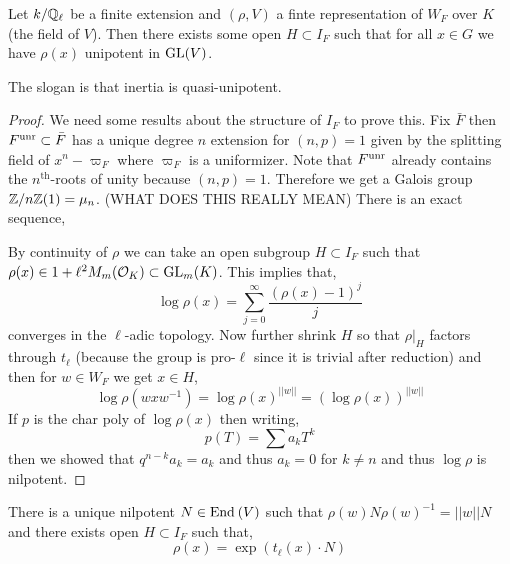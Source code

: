 \documentclass[12pt]{article}
\begin{document}
\begin{thm}
Let $k / \mathbb{Q}_\ell$ be a finite extension and $(\rho, V)$ a finte representation of $W_F$ over $K$ (the field of $V$). Then there exists some open $H \subset I_F$ such that for all $x \in G$ we have $\rho(x)$ unipotent in $\mathrm{GL}(V)$.
\end{thm}

\begin{rmk}
The slogan is that inertia is quasi-unipotent. 
\end{rmk}

\begin{proof}
We need some results about the structure of $I_F$ to prove this.
 Fix $\bar{F}$ then $F^{\mathrm{unr}} \subset \bar{F}$ has a unique degree $n$ extension for $(n,p) = 1$ given by the splitting field of $x^n - \varpi_F$ where $\varpi_F$ is a uniformizer. Note that $F^{\mathrm{unr}}$ already contains the $n^{\text{th}}$-roots of unity because $(n,p) = 1$. Therefore we get a Galois group $\mathbb{Z} / n \mathbb{Z}(1) = \mu_n$. (WHAT DOES THIS REALLY MEAN) There is an exact sequence,
\begin{center}
\end{center}
By continuity of $\rho$ we can take an open subgroup $H \subset I_F$ such that $\rho(x) \in 1 + \ell^2 M_m(\mathcal{O}_{K}) \subset \mathrm{GL}_m(K)$. This implies that,
\[ \log{\rho(x)} = \sum_{j = 0}^\infty \frac{(\rho(x) - 1)^j}{j} \]
converges in the $\ell$-adic topology. Now further shrink $H$ so that $\rho|_H$ factors through $t_{\ell}$ (because the group is pro-$\ell$ since it is trivial after reduction) and then for $w \in W_F$ we get $x \in H$,
\[ \log{\rho(wxw^{-1})} = \log{\rho(x)^{||w||}} = (\log{\rho(x)})^{||w||} \]
If $p$ is the char poly of $\log{\rho(x)}$ then writing,
\[ p(T) = \sum a_k T^k \]
then we showed that $q^{n-k} a_k = a_k$ and thus $a_k = 0$ for $k \neq n$ and thus $\log{\rho}$ is nilpotent. 
\end{proof}


\begin{cor}
There is a unique nilpotent $N \in \mathrm{End}_{} \left( V \right)$ such that $\rho(w) N \rho(w)^{-1} = ||w|| N$ and there exists open $H \subset I_F$ such that,
\[ \rho(x) = \exp(t_\ell(x) \cdot N) \]
\end{cor}
\end{document}
